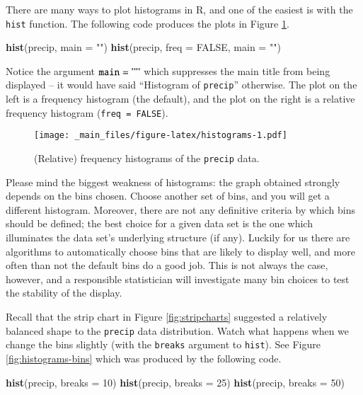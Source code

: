 \documentclass[]{book}
\newenvironment{Shaded}{\begin{snugshade}}{\end{snugshade}}
\newcommand{\KeywordTok}[1]{\textcolor[rgb]{0.13,0.29,0.53}{\textbf{{#1}}}}
\newcommand{\DataTypeTok}[1]{\textcolor[rgb]{0.13,0.29,0.53}{{#1}}}
\newcommand{\DecValTok}[1]{\textcolor[rgb]{0.00,0.00,0.81}{{#1}}}
\newcommand{\StringTok}[1]{\textcolor[rgb]{0.31,0.60,0.02}{{#1}}}
\newcommand{\OtherTok}[1]{\textcolor[rgb]{0.56,0.35,0.01}{{#1}}}
\newcommand{\NormalTok}[1]{{#1}}
\numberwithin{equation}{chapter}
\numberwithin{figure}{chapter}
\theoremstyle{plain}
\theoremstyle{definition}
\theoremstyle{remark}
\theoremstyle{definition}
\theoremstyle{definition}
\theoremstyle{remark}
\begin{document}
There are many ways to plot histograms in R, and one of the easiest is
with the \texttt{hist}  function. The
following code produces the plots in Figure \ref{fig:histograms}.

\begin{Shaded}
\begin{Highlighting}[]
\KeywordTok{hist}\NormalTok{(precip, }\DataTypeTok{main =} \StringTok{""}\NormalTok{)}
\KeywordTok{hist}\NormalTok{(precip, }\DataTypeTok{freq =} \OtherTok{FALSE}\NormalTok{, }\DataTypeTok{main =} \StringTok{""}\NormalTok{)}
\end{Highlighting}
\end{Shaded}

Notice the argument \(\mathtt{main = ""}\) which suppresses the main
title from being displayed -- it would have said ``Histogram of
\texttt{precip}'' otherwise. The plot on the left is a frequency
histogram (the default), and the plot on the right is a relative
frequency histogram (\texttt{freq\ =\ FALSE}).

\begin{figure}[htbp]
\centering
\texttt{[image: \_main\_files/figure-latex/histograms-1.pdf]}
\caption{\label{fig:histograms}\small (Relative) frequency histograms of the
\texttt{precip} data.}
\end{figure}




Please mind the biggest weakness of histograms: the graph obtained
strongly depends on the bins chosen. Choose another set of bins, and you
will get a different histogram. Moreover, there are not any definitive
criteria by which bins should be defined; the best choice for a given
data set is the one which illuminates the data set's underlying
structure (if any). Luckily for us there are algorithms to automatically
choose bins that are likely to display well, and more often than not the
default bins do a good job. This is not always the case, however, and a
responsible statistician will investigate many bin choices to test the
stability of the display.

Recall that the strip chart in Figure \ref{fig:stripcharts} suggested a
relatively balanced shape to the \texttt{precip} data distribution.
Watch what happens when we change the bins slightly (with the
\texttt{breaks} argument to \texttt{hist}). See Figure
\ref{fig:histograms-bins} which was produced by the following code.

\begin{Shaded}
\begin{Highlighting}[]
\KeywordTok{hist}\NormalTok{(precip, }\DataTypeTok{breaks =} \DecValTok{10}\NormalTok{)}
\KeywordTok{hist}\NormalTok{(precip, }\DataTypeTok{breaks =} \DecValTok{25}\NormalTok{)}
\KeywordTok{hist}\NormalTok{(precip, }\DataTypeTok{breaks =} \DecValTok{50}\NormalTok{)}
\end{Highlighting}
\end{Shaded}
\end{document}

